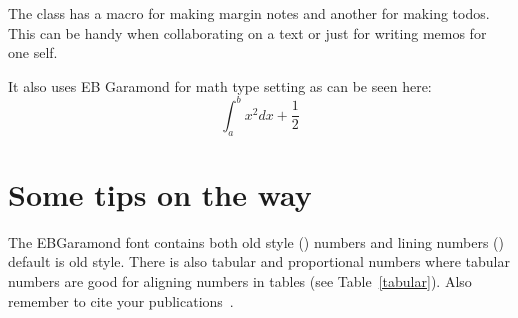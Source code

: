 \documentclass[pharmbio, watermark]{pbpreprint}
\begin{document}
The class has a macro for making margin notes and
another for making todos. This can be handy when
collaborating on a text or just for writing memos for one self.

It also uses EB Garamond for math type setting as can be seen here:
\begin{equation}
    \int_{a}^{b} x^2 dx + \frac{1}{2}
\end{equation}


\section{Some tips on the way}
The EBGaramond font contains both old style () numbers and lining numbers () default is old style. There is also tabular and proportional numbers where
tabular numbers are good for aligning numbers in tables (see
Table~\ref{tabular}). Also remember to cite your
publications~\cite{spjuth2007bioclipse}.~\smiley{}


\begin{table}[h]
    \caption{Comparison of tabular nums and proportional numbers}
    \hfill
    \hfill
    \hfill
\end{table}
\end{document}
